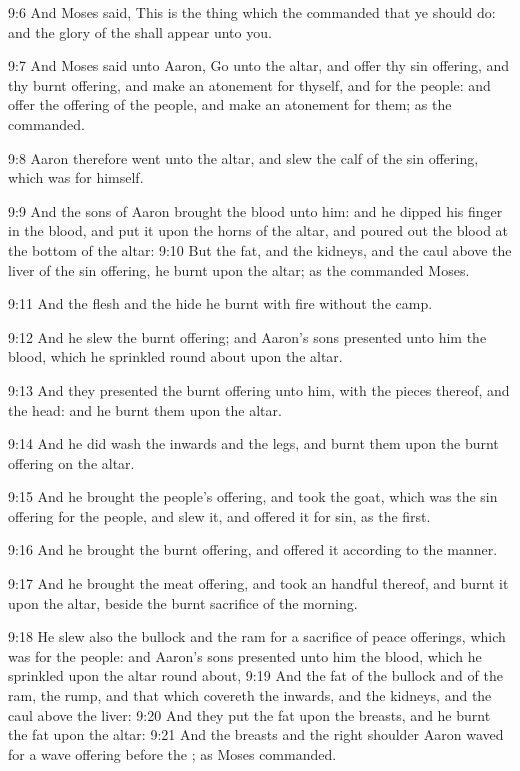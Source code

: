 9:6 And Moses said, This is the thing which the \LORD commanded that ye should do: and the glory of the \LORD shall appear unto you.

9:7 And Moses said unto Aaron, Go unto the altar, and offer thy sin offering, and thy burnt offering, and make an atonement for thyself, and for the people: and offer the offering of the people, and make an atonement for them; as the \LORD commanded.

9:8 Aaron therefore went unto the altar, and slew the calf of the sin offering, which was for himself.

9:9 And the sons of Aaron brought the blood unto him: and he dipped his finger in the blood, and put it upon the horns of the altar, and poured out the blood at the bottom of the altar: 9:10 But the fat, and the kidneys, and the caul above the liver of the sin offering, he burnt upon the altar; as the \LORD commanded Moses.

9:11 And the flesh and the hide he burnt with fire without the camp.

9:12 And he slew the burnt offering; and Aaron's sons presented unto him the blood, which he sprinkled round about upon the altar.

9:13 And they presented the burnt offering unto him, with the pieces thereof, and the head: and he burnt them upon the altar.

9:14 And he did wash the inwards and the legs, and burnt them upon the burnt offering on the altar.

9:15 And he brought the people's offering, and took the goat, which was the sin offering for the people, and slew it, and offered it for sin, as the first.

9:16 And he brought the burnt offering, and offered it according to the manner.

9:17 And he brought the meat offering, and took an handful thereof, and burnt it upon the altar, beside the burnt sacrifice of the morning.

9:18 He slew also the bullock and the ram for a sacrifice of peace offerings, which was for the people: and Aaron's sons presented unto him the blood, which he sprinkled upon the altar round about, 9:19 And the fat of the bullock and of the ram, the rump, and that which covereth the inwards, and the kidneys, and the caul above the liver: 9:20 And they put the fat upon the breasts, and he burnt the fat upon the altar: 9:21 And the breasts and the right shoulder Aaron waved for a wave offering before the \LORD; as Moses commanded.

